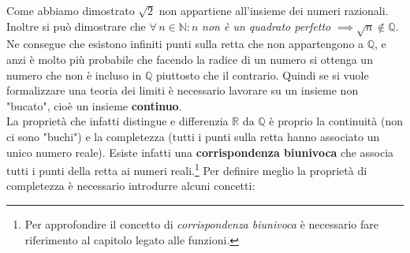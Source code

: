 Come abbiamo dimostrato $\sqrt{2}$ non appartiene all'insieme dei numeri razionali. Inoltre si può dimostrare che $\forall\, n \in \mathbb{N} : n$ \textit{non è un quadrato perfetto} $\implies \sqrt{n} \notin \mathbb{Q}$.
Ne consegue che esistono infiniti punti sulla retta che non appartengono a $\mathbb{Q}$, e anzi è molto più probabile che facendo la radice di un numero si ottenga un numero che non è incluso in $\mathbb{Q}$ piuttosto che il contrario. Quindi se si vuole formalizzare una teoria dei limiti è necessario lavorare su un insieme non "bucato", cioè un insieme \textbf{continuo}.\\

La proprietà che infatti distingue e differenzia $\mathbb{R}$ da $\mathbb{Q}$ è proprio la continuità (non ci sono "buchi") e la completezza (tutti i punti sulla retta hanno associato un unico numero reale). Esiste infatti una \textbf{corrispondenza biunivoca} che associa tutti i punti della retta ai numeri reali.\footnote{Per approfondire il concetto di \textit{corrispondenza biunivoca} è necessario fare riferimento al capitolo legato alle funzioni.}
Per definire meglio la proprietà di completezza è necessario introdurre alcuni concetti:

